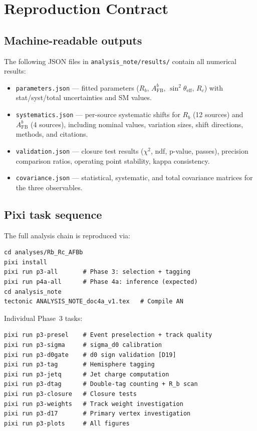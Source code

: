 \documentclass[11pt,a4paper]{article}
\begin{document}
\section{Reproduction Contract}
\label{app:reproduction}

\subsection{Machine-readable outputs}

The following JSON files in \texttt{analysis\_note/results/} contain all numerical
results:

\begin{itemize}
\item \texttt{parameters.json} --- fitted parameters ($R_b$, $A_\mathrm{FB}^b$,
$\sin^2\theta_\mathrm{eff}$, $R_c$) with stat/syst/total uncertainties and SM values.
\item \texttt{systematics.json} --- per-source systematic shifts for $R_b$ (12 sources)
and $A_\mathrm{FB}^b$ (4 sources), including nominal values, variation sizes, shift
directions, methods, and citations.
\item \texttt{validation.json} --- closure test results ($\chi^2$, ndf, p-value, passes),
precision comparison ratios, operating point stability, kappa consistency.
\item \texttt{covariance.json} --- statistical, systematic, and total covariance matrices
for the three observables.
\end{itemize}

\subsection{Pixi task sequence}

The full analysis chain is reproduced via:
\begin{verbatim}
cd analyses/Rb_Rc_AFBb
pixi install
pixi run p3-all       # Phase 3: selection + tagging
pixi run p4a-all      # Phase 4a: inference (expected)
cd analysis_note
tectonic ANALYSIS_NOTE_doc4a_v1.tex   # Compile AN
\end{verbatim}

Individual Phase~3 tasks:
\begin{verbatim}
pixi run p3-presel    # Event preselection + track quality
pixi run p3-sigma     # sigma_d0 calibration
pixi run p3-d0gate    # d0 sign validation [D19]
pixi run p3-tag       # Hemisphere tagging
pixi run p3-jetq      # Jet charge computation
pixi run p3-dtag      # Double-tag counting + R_b scan
pixi run p3-closure   # Closure tests
pixi run p3-weights   # Track weight investigation
pixi run p3-d17       # Primary vertex investigation
pixi run p3-plots     # All figures
\end{verbatim}
\end{document}
